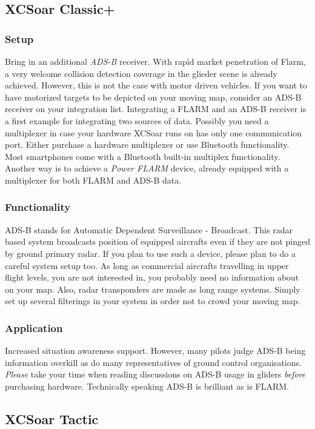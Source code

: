 \subsection*{XCSoar Classic+}
\subsubsection*{Setup} Bring in an additional \emph{ADS-B} receiver. With rapid 
market penetration of Flarm, a very welcome collision detection coverage in the 
glieder scene is already achieved. However, this is not the case with motor 
driven vehicles. If you want to have motorized targets to be depicted on your 
moving map, consider an ADS-B receiver on your integration list. Integrating a 
FLARM and an ADS-B receiver is a first example for integrating two sources of
data. Possibly you need a multiplexer in case your hardware XCSoar runs on has
only one communication port. Either purchase a hardware multiplexer or use
Bluetooth functionality. Most smartphones come with a Bluetooth built-in
multiplex functionality. Another way is to achieve a \emph{Power FLARM} device,
already equipped with a multiplexer for both FLARM and ADS-B data.

\subsubsection*{Functionality} ADS-B stands for Automatic Dependent Surveillance 
- Broadcast. 
This radar based system broadcasts position of equipped aircrafts even if they 
are not pinged by ground primary radar. If you plan to use such a device, 
please plan to do a careful system setup too. As long as commercial aircrafts 
travelling in upper flight levels, you are not interested in, you probably need
no information about on your map. Also, radar transponders are made as long 
range systems. Simply set up several filterings in your system in order not to 
crowd your moving map.

\subsubsection*{Application} Increased situation awareness support. However, many 
pilots judge ADS-B being information overkill as do many representatives of 
ground control organisations. \emph{Please} take your time when reading 
discussions on ADS-B usage in gliders \emph{before} purchasing hardware. 
Technically speaking ADS-B is brilliant as is FLARM.

\subsection*{XCSoar Tactic}
